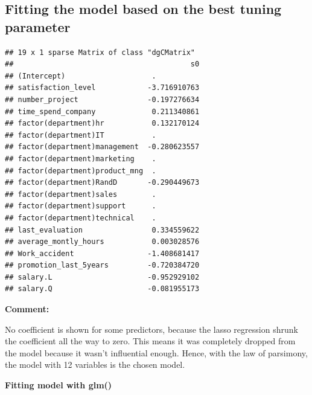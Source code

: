 \documentclass[
  11pt,
]{article}
\newenvironment{Shaded}{\begin{snugshade}}{\end{snugshade}}
\newcommand{\AttributeTok}[1]{\textcolor[rgb]{0.13,0.29,0.53}{#1}}
\newcommand{\DecValTok}[1]{\textcolor[rgb]{0.00,0.00,0.81}{#1}}
\newcommand{\FloatTok}[1]{\textcolor[rgb]{0.00,0.00,0.81}{#1}}
\newcommand{\FunctionTok}[1]{\textcolor[rgb]{0.13,0.29,0.53}{\textbf{#1}}}
\newcommand{\NormalTok}[1]{#1}
\newcommand{\OtherTok}[1]{\textcolor[rgb]{0.56,0.35,0.01}{#1}}
\newcommand{\SpecialCharTok}[1]{\textcolor[rgb]{0.81,0.36,0.00}{\textbf{#1}}}
\newcommand{\StringTok}[1]{\textcolor[rgb]{0.31,0.60,0.02}{#1}}
\begin{document}
\subsection{Fitting the model based on the best tuning parameter}

\begin{Shaded}
\end{Shaded}

\begin{verbatim}
## 19 x 1 sparse Matrix of class "dgCMatrix"
##                                         s0
## (Intercept)                    .          
## satisfaction_level            -3.716910763
## number_project                -0.197276634
## time_spend_company             0.211340861
## factor(department)hr           0.132170124
## factor(department)IT           .          
## factor(department)management  -0.280623557
## factor(department)marketing    .          
## factor(department)product_mng  .          
## factor(department)RandD       -0.290449673
## factor(department)sales        .          
## factor(department)support      .          
## factor(department)technical    .          
## last_evaluation                0.334559622
## average_montly_hours           0.003028576
## Work_accident                 -1.408681417
## promotion_last_5years         -0.720384720
## salary.L                      -0.952929102
## salary.Q                      -0.081955173
\end{verbatim}

\textbf{Comment:}

No coefficient is shown for some predictors, because the lasso
regression shrunk the coefficient all the way to zero. This means it was
completely dropped from the model because it wasn't influential enough.
Hence, with the law of parsimony, the model with 12 variables is the
chosen model.

\hfill\break
\textbf{Fitting model with glm()}
\end{document}
